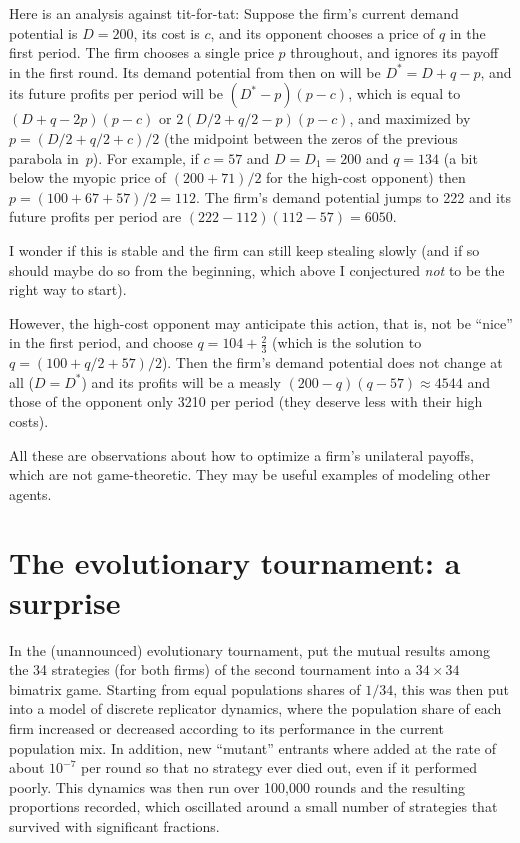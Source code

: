 \documentclass[a4paper,12pt]{article}  %
\theoremstyle{definition}
\begin{document}
Here is an analysis against tit-for-tat:
Suppose the firm's current demand potential
is $D=200$, its cost is $c$, and its opponent chooses a price
of $q$ in the first period. The firm chooses a single price
$p$ throughout, and ignores its payoff in the first round.
Its demand potential from then on will be $D^* = D + q - p$,
and its future profits per period will be $(D^* - p)(p - c)$,
which is equal to $(D + q - 2p)(p-c)$ or $2(D/2 + q/2 -
p)(p-c)$, and maximized by $p = (D/2 + q/2 + c)/2$
(the midpoint between the zeros of the previous parabola
in~$p$).
For example, if $c=57$ and $D=D_1=200$ and $q=134$ (a bit below the
myopic price of $(200+71)/2$ for the high-cost opponent)
then $p = (100 + 67 + 57)/2 = 112$. 
The firm's demand potential 
jumps to 222 and its future profits per period are
$(222-112)(112-57) = 6050$.

I wonder if this is stable and the firm can still keep stealing
slowly (and if so should maybe do so from the beginning,
which above I conjectured \textit{not} to be the right way to start). 

However, the high-cost opponent may anticipate this action,
that is, not be ``nice'' in the first period, and choose
$q=104+\frac23$ (which
is the solution to $q = (100 + q/2 + 57)/2$).
Then the firm's demand 
potential does not change at all ($D=D^*$) and its profits
will be a measly $(200-q)(q-57)\approx 4544$ and those of
the opponent only 3210 per period (they deserve less with
their high costs).

All these are observations about how to optimize a firm's
unilateral payoffs, which are not game-theoretic.
They may be useful examples of modeling other agents.

\section{The evolutionary tournament: a surprise}
\label{s-evol}

In the (unannounced) evolutionary tournament, \citet{Keser1992}
put the mutual results among the 34 strategies (for both
firms) of the second tournament into a $34\times 34$ bimatrix
game.
Starting from equal populations shares of $1/34$, this was
then put into a model of discrete replicator dynamics, where 
the population share of each firm increased or decreased
according to its performance in the current population mix.
In addition, new ``mutant'' entrants where added at the rate
of about $10^{-7}$ per round so that no strategy ever died out,
even if it performed poorly.
This dynamics was then run over 100,000 rounds and the
resulting proportions recorded, which oscillated around 
a small number of strategies that survived with significant
fractions.
\end{document}
